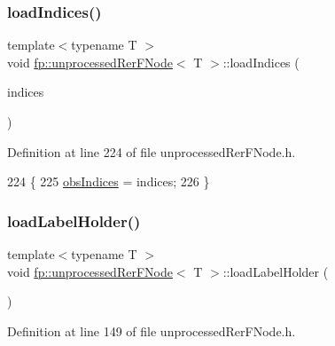 \subsubsection{\texorpdfstring{load\+Indices()}{loadIndices()}}
{\footnotesize\ttfamily template$<$typename T $>$ \\
void \hyperlink{classfp_1_1unprocessedRerFNode}{fp\+::unprocessed\+Rer\+F\+Node}$<$ T $>$\+::load\+Indices (\begin{DoxyParamCaption}\item[{\hyperlink{classfp_1_1stratifiedInNodeClassIndices}{stratified\+In\+Node\+Class\+Indices} $\ast$}]{indices }\end{DoxyParamCaption})\hspace{0.3cm}{\ttfamily [inline]}}



Definition at line 224 of file unprocessed\+Rer\+F\+Node.\+h.


\begin{DoxyCode}
224                                                                               \{
225                     \hyperlink{classfp_1_1unprocessedRerFNode_ad52d9d508bf378bc793b8cf961163735}{obsIndices} = indices;
226                 \}
\end{DoxyCode}
\mbox{\label{classfp_1_1unprocessedRerFNode_ad4ed23c3eecd133c0f194b94d7e75404}} 
\subsubsection{\texorpdfstring{load\+Label\+Holder()}{loadLabelHolder()}}
{\footnotesize\ttfamily template$<$typename T $>$ \\
void \hyperlink{classfp_1_1unprocessedRerFNode}{fp\+::unprocessed\+Rer\+F\+Node}$<$ T $>$\+::load\+Label\+Holder (\begin{DoxyParamCaption}{ }\end{DoxyParamCaption})\hspace{0.3cm}{\ttfamily [inline]}}



Definition at line 149 of file unprocessed\+Rer\+F\+Node.\+h.



